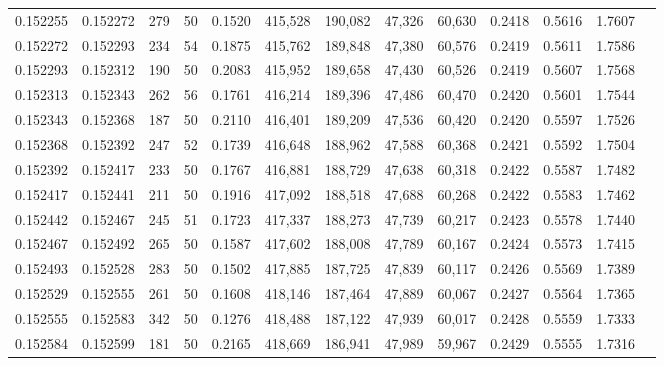 \begin{tabular}{rrrrrrrrrrrrr}
0.152255 & 0.152272 &   279 &  50 &                                     0.1520 & 415,528 & 190,082 &  47,326 &  60,630 & 0.2418 & 0.5616 & 1.7607 \\
0.152272 & 0.152293 &   234 &  54 &                                     0.1875 & 415,762 & 189,848 &  47,380 &  60,576 & 0.2419 & 0.5611 & 1.7586 \\
0.152293 & 0.152312 &   190 &  50 &                                     0.2083 & 415,952 & 189,658 &  47,430 &  60,526 & 0.2419 & 0.5607 & 1.7568 \\
0.152313 & 0.152343 &   262 &  56 &                                     0.1761 & 416,214 & 189,396 &  47,486 &  60,470 & 0.2420 & 0.5601 & 1.7544 \\
0.152343 & 0.152368 &   187 &  50 &                                     0.2110 & 416,401 & 189,209 &  47,536 &  60,420 & 0.2420 & 0.5597 & 1.7526 \\
0.152368 & 0.152392 &   247 &  52 &                                     0.1739 & 416,648 & 188,962 &  47,588 &  60,368 & 0.2421 & 0.5592 & 1.7504 \\
0.152392 & 0.152417 &   233 &  50 &                                     0.1767 & 416,881 & 188,729 &  47,638 &  60,318 & 0.2422 & 0.5587 & 1.7482 \\
0.152417 & 0.152441 &   211 &  50 &                                     0.1916 & 417,092 & 188,518 &  47,688 &  60,268 & 0.2422 & 0.5583 & 1.7462 \\
0.152442 & 0.152467 &   245 &  51 &                                     0.1723 & 417,337 & 188,273 &  47,739 &  60,217 & 0.2423 & 0.5578 & 1.7440 \\
0.152467 & 0.152492 &   265 &  50 &                                     0.1587 & 417,602 & 188,008 &  47,789 &  60,167 & 0.2424 & 0.5573 & 1.7415 \\
0.152493 & 0.152528 &   283 &  50 &                                     0.1502 & 417,885 & 187,725 &  47,839 &  60,117 & 0.2426 & 0.5569 & 1.7389 \\
0.152529 & 0.152555 &   261 &  50 &                                     0.1608 & 418,146 & 187,464 &  47,889 &  60,067 & 0.2427 & 0.5564 & 1.7365 \\
0.152555 & 0.152583 &   342 &  50 &                                     0.1276 & 418,488 & 187,122 &  47,939 &  60,017 & 0.2428 & 0.5559 & 1.7333 \\
0.152584 & 0.152599 &   181 &  50 &                                     0.2165 & 418,669 & 186,941 &  47,989 &  59,967 & 0.2429 & 0.5555 & 1.7316 \\

\end{tabular}
